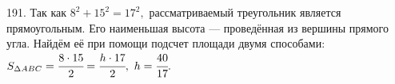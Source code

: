 191. Так как $8^2+15^2=17^2,$ рассматриваемый треугольник является прямоугольным. Его наименьшая высота --- проведённая из вершины прямого угла. Найдём её при помощи подсчет площади двумя способами: $S_{\Delta ABC}=\cfrac{8\cdot15}{2}=\cfrac{h\cdot17}{2},\ h=\cfrac{40}{17}.$\\

